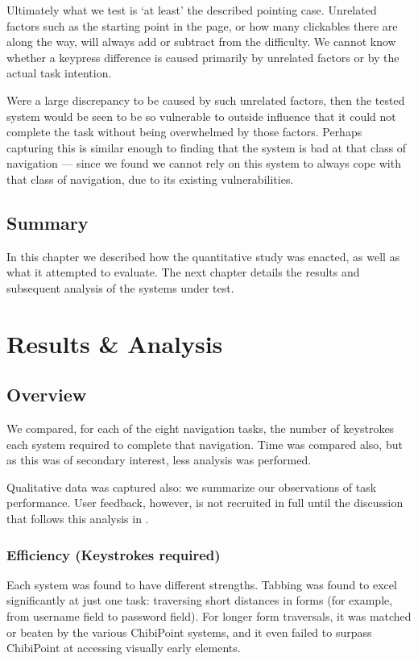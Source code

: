 \documentclass[11pt,openright,a4paper]{report}
\begin{document}
Ultimately what we test is `at least' the described pointing case. Unrelated factors such as the starting point in the page, or how many clickables there are along the way, will always add or subtract from the difficulty. We cannot know whether a keypress difference is caused primarily by unrelated factors or by the actual task intention.

Were a large discrepancy to be caused by such unrelated factors, then the tested system would be seen to be so vulnerable to outside influence that it could not complete the task without being overwhelmed by those factors. Perhaps capturing this is similar enough to finding that the system is bad at that class of navigation --- since we found we cannot rely on this system to always cope with that class of navigation, due to its existing vulnerabilities.

\section{Summary}
In this chapter we described how the quantitative study was enacted, as well as what it attempted to evaluate. The next chapter details the results and subsequent analysis of the systems under test.

\chapter{Results \& Analysis}
\label{chap:results}
\section{Overview}
We compared, for each of the eight navigation tasks, the number of keystrokes each system required to complete that navigation. Time was compared also, but as this was of secondary interest, less analysis was performed.

Qualitative data was captured also: we summarize our observations of task performance. User feedback, however, is not recruited in full until the discussion that follows this analysis in .
\subsection{Efficiency (Keystrokes required)}
Each system was found to have different strengths. Tabbing was found to excel significantly at just one task: traversing short distances in forms (for example, from username field to password field). For longer form traversals, it was matched or beaten by the various ChibiPoint systems, and it even failed to surpass ChibiPoint at accessing visually early elements.
\end{document}
